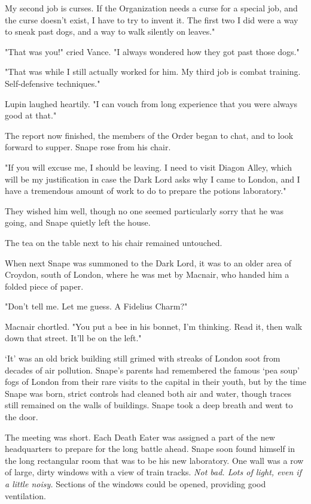 \textooquote My second job is curses. If the Organization needs a curse for a special job, and the curse doesn't exist, I have to try to invent it. The first two I did were a way to sneak past dogs, and a way to walk silently on leaves."

"That was you!" cried Vance. "I always wondered how they got past those dogs."

"That was while I still actually worked for him. My third job is combat training. Self-defensive techniques."

Lupin laughed heartily. "I can vouch from long experience that you were always good at that."

The report now finished, the members of the Order began to chat, and to look forward to supper. Snape rose from his chair.

"If you will excuse me, I should be leaving. I need to visit Diagon Alley, which will be my justification in case the Dark Lord asks why I came to London, and I have a tremendous amount of work to do to prepare the potions laboratory."

They wished him well, though no one seemed particularly sorry that he was going, and Snape quietly left the house.

The tea on the table next to his chair remained untouched.

\sbreak

When next Snape was summoned to the Dark Lord, it was to an older area of Croydon, south of London, where he was met by Macnair, who handed him a folded piece of paper.

"Don't tell me. Let me guess. A Fidelius Charm?"

Macnair chortled. "You put a bee in his bonnet, I'm thinking. Read it, then walk down that street. It'll be on the left."

`It' was an old brick building still grimed with streaks of London soot from decades of air pollution. Snape's parents had remembered the famous `pea soup' fogs of London from their rare visits to the capital in their youth, but by the time Snape was born, strict controls had cleaned both air and water, though traces still remained on the walls of buildings. Snape took a deep breath and went to the door.

The meeting was short. Each Death Eater was assigned a part of the new headquarters to prepare for the long battle ahead. Snape soon found himself in the long rectangular room that was to be his new laboratory. One wall was a row of large, dirty windows with a view of train tracks. \emph{Not bad. Lots of light, even if a little noisy.} Sections of the windows could be opened, providing good ventilation.

